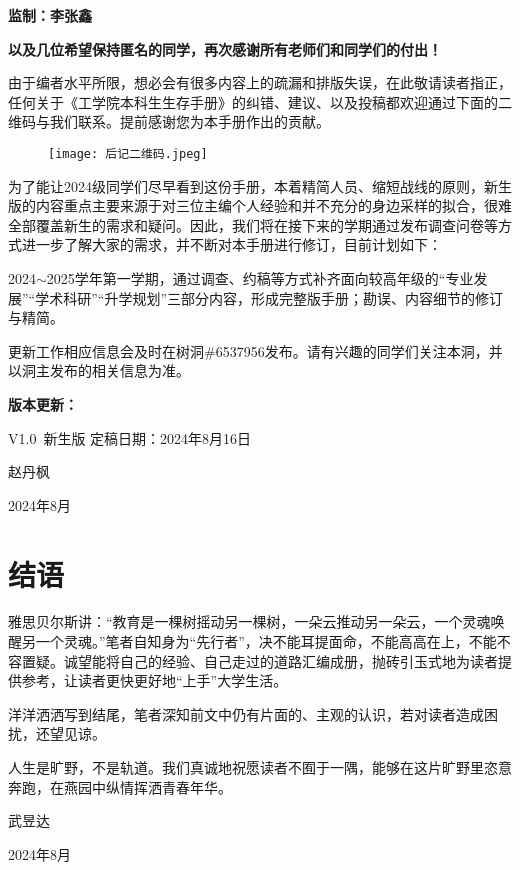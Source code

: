 \documentclass[11pt,oneside]{book}
\begin{document}
\textbf{监制：李张鑫}

\textbf{以及几位希望保持匿名的同学，再次感谢所有老师们和同学们的付出！}


由于编者水平所限，想必会有很多内容上的疏漏和排版失误，在此敬请读者指正，任何关于《工学院本科生生存手册》的纠错、建议、以及投稿都欢迎通过下面的二维码与我们联系。提前感谢您为本手册作出的贡献。
\begin{figure}[htbp]
	\centering
	\texttt{[image: 后记二维码.jpeg]}
\end{figure}

为了能让2024级同学们尽早看到这份手册，本着精简人员、缩短战线的原则，新生版的内容重点主要来源于对三位主编个人经验和并不充分的身边采样的拟合，很难全部覆盖新生的需求和疑问。因此，我们将在接下来的学期通过发布调查问卷等方式进一步了解大家的需求，并不断对本手册进行修订，目前计划如下：

2024$\sim$2025学年第一学期，通过调查、约稿等方式补齐面向较高年级的“专业发展”“学术科研”“升学规划”三部分内容，形成完整版手册；勘误、内容细节的修订与精简。

更新工作相应信息会及时在树洞\#6537956发布。请有兴趣的同学们关注本洞，并以洞主发布的相关信息为准。

\textbf{版本更新：}

V1.0\ 新生版 定稿日期：2024年8月16日

\begin{flushright}
	赵丹枫
	
	2024年8月
\end{flushright}
\chapter*{结语}
雅思贝尔斯讲：“教育是一棵树摇动另一棵树，一朵云推动另一朵云，一个灵魂唤醒另一个灵魂。”笔者自知身为“先行者”，决不能耳提面命，不能高高在上，不能不容置疑。诚望能将自己的经验、自己走过的道路汇编成册，抛砖引玉式地为读者提供参考，让读者更快更好地“上手”大学生活。

洋洋洒洒写到结尾，笔者深知前文中仍有片面的、主观的认识，若对读者造成困扰，还望见谅。

人生是旷野，不是轨道。我们真诚地祝愿读者不囿于一隅，能够在这片旷野里恣意奔跑，在燕园中纵情挥洒青春年华。

\begin{flushright}
	武昱达
	
	2024年8月
\end{flushright}
\end{document}
